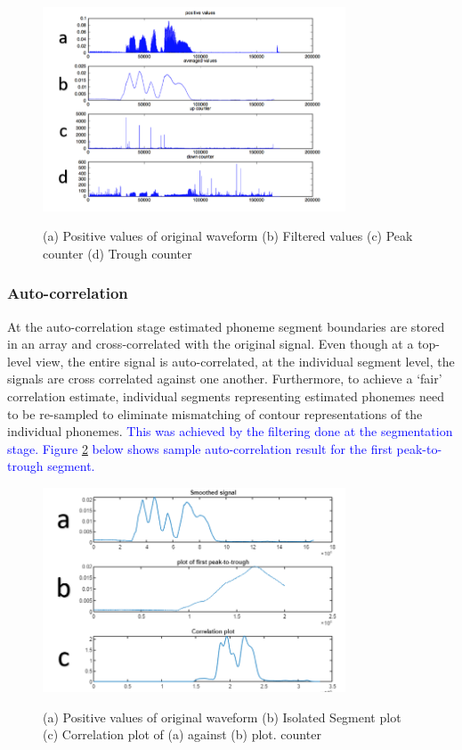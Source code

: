 \begin{figure}
\centering
  \includegraphics[width=9cm]{thesis/images/corr00}\\
  \caption{(a) Positive values of original waveform (b) Filtered values (c) Peak counter (d) Trough counter}\label{fig_c3_exp02}
\end{figure}
\subsubsection{Auto-correlation}
At the auto-correlation stage estimated phoneme segment boundaries are stored in an array and cross-correlated with the original signal.  Even though at a top-level view, the entire signal is auto-correlated, at the individual segment level, the signals are cross correlated against one another.  Furthermore, to achieve a ‘fair’ correlation estimate, individual segments representing estimated phonemes need to be re-sampled to eliminate mismatching of contour representations of the individual phonemes.\textcolor{blue}{  This was achieved by the filtering done at the segmentation stage.  Figure \ref{fig_c3_exp03} below shows sample auto-correlation result for the first peak-to-trough segment.}
\begin{figure}
\centering
  \includegraphics[width=9cm]{thesis/images/corr01}\\
  \caption{(a) Positive values of original waveform (b) Isolated Segment plot (c) Correlation plot of (a) against (b) plot. counter}\label{fig_c3_exp03}
\end{figure}

